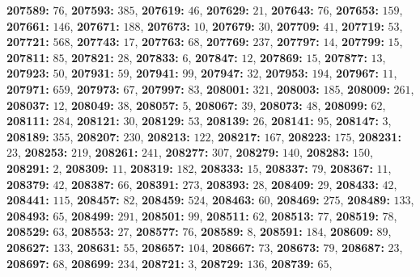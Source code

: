 \textsf{\bfseries 207589:} $76$, \textsf{\bfseries 207593:} $385$, \textsf{\bfseries 207619:} $46$, \textsf{\bfseries 207629:} $21$, \textsf{\bfseries 207643:} $76$, \textsf{\bfseries 207653:} $159$, \textsf{\bfseries 207661:} $146$, \textsf{\bfseries 207671:} $188$, \textsf{\bfseries 207673:} $10$, \textsf{\bfseries 207679:} $30$, \textsf{\bfseries 207709:} $41$, \textsf{\bfseries 207719:} $53$, \textsf{\bfseries 207721:} $568$, \textsf{\bfseries 207743:} $17$, \textsf{\bfseries 207763:} $68$, \textsf{\bfseries 207769:} $237$, \textsf{\bfseries 207797:} $14$, \textsf{\bfseries 207799:} $15$, \textsf{\bfseries 207811:} $85$, \textsf{\bfseries 207821:} $28$, \textsf{\bfseries 207833:} $6$, \textsf{\bfseries 207847:} $12$, \textsf{\bfseries 207869:} $15$, \textsf{\bfseries 207877:} $13$, \textsf{\bfseries 207923:} $50$, \textsf{\bfseries 207931:} $59$, \textsf{\bfseries 207941:} $99$, \textsf{\bfseries 207947:} $32$, \textsf{\bfseries 207953:} $194$, \textsf{\bfseries 207967:} $11$, \textsf{\bfseries 207971:} $659$, \textsf{\bfseries 207973:} $67$, \textsf{\bfseries 207997:} $83$, \textsf{\bfseries 208001:} $321$, \textsf{\bfseries 208003:} $185$, \textsf{\bfseries 208009:} $261$, \textsf{\bfseries 208037:} $12$, \textsf{\bfseries 208049:} $38$, \textsf{\bfseries 208057:} $5$, \textsf{\bfseries 208067:} $39$, \textsf{\bfseries 208073:} $48$, \textsf{\bfseries 208099:} $62$, \textsf{\bfseries 208111:} $284$, \textsf{\bfseries 208121:} $30$, \textsf{\bfseries 208129:} $53$, \textsf{\bfseries 208139:} $26$, \textsf{\bfseries 208141:} $95$, \textsf{\bfseries 208147:} $3$, \textsf{\bfseries 208189:} $355$, \textsf{\bfseries 208207:} $230$, \textsf{\bfseries 208213:} $122$, \textsf{\bfseries 208217:} $167$, \textsf{\bfseries 208223:} $175$, \textsf{\bfseries 208231:} $23$, \textsf{\bfseries 208253:} $219$, \textsf{\bfseries 208261:} $241$, \textsf{\bfseries 208277:} $307$, \textsf{\bfseries 208279:} $140$, \textsf{\bfseries 208283:} $150$, \textsf{\bfseries 208291:} $2$, \textsf{\bfseries 208309:} $11$, \textsf{\bfseries 208319:} $182$, \textsf{\bfseries 208333:} $15$, \textsf{\bfseries 208337:} $79$, \textsf{\bfseries 208367:} $11$, \textsf{\bfseries 208379:} $42$, \textsf{\bfseries 208387:} $66$, \textsf{\bfseries 208391:} $273$, \textsf{\bfseries 208393:} $28$, \textsf{\bfseries 208409:} $29$, \textsf{\bfseries 208433:} $42$, \textsf{\bfseries 208441:} $115$, \textsf{\bfseries 208457:} $82$, \textsf{\bfseries 208459:} $524$, \textsf{\bfseries 208463:} $60$, \textsf{\bfseries 208469:} $275$, \textsf{\bfseries 208489:} $133$, \textsf{\bfseries 208493:} $65$, \textsf{\bfseries 208499:} $291$, \textsf{\bfseries 208501:} $99$, \textsf{\bfseries 208511:} $62$, \textsf{\bfseries 208513:} $77$, \textsf{\bfseries 208519:} $78$, \textsf{\bfseries 208529:} $63$, \textsf{\bfseries 208553:} $27$, \textsf{\bfseries 208577:} $76$, \textsf{\bfseries 208589:} $8$, \textsf{\bfseries 208591:} $184$, \textsf{\bfseries 208609:} $89$, \textsf{\bfseries 208627:} $133$, \textsf{\bfseries 208631:} $55$, \textsf{\bfseries 208657:} $104$, \textsf{\bfseries 208667:} $73$, \textsf{\bfseries 208673:} $79$, \textsf{\bfseries 208687:} $23$, \textsf{\bfseries 208697:} $68$, \textsf{\bfseries 208699:} $234$, \textsf{\bfseries 208721:} $3$, \textsf{\bfseries 208729:} $136$, \textsf{\bfseries 208739:} $65$, 
